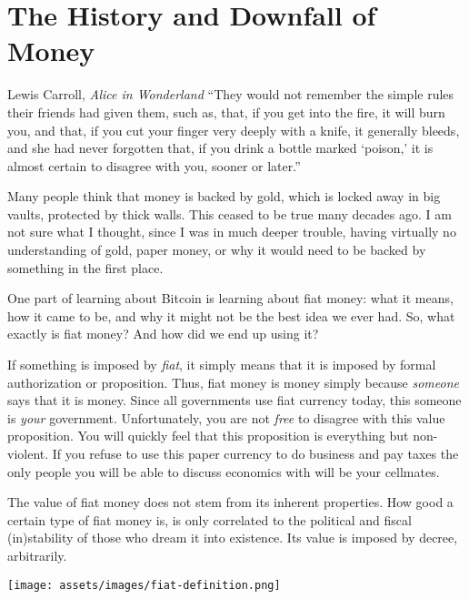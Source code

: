 \chapter{The History and Downfall of Money}
\label{les:12}

\begin{chapquote}{Lewis Carroll, \textit{Alice in Wonderland}}
\enquote{They would not remember the simple rules their friends had given them, such
as, that, if you get into the fire, it will burn you, and that, if you cut your
finger very deeply with a knife, it generally bleeds, and she had never
forgotten that, if you drink a bottle marked `poison,' it is almost certain to
disagree with you, sooner or later.}
\end{chapquote}

Many people think that money is backed by gold, which is locked away in
big vaults, protected by thick
walls. This ceased to be true many decades ago. I am not sure what I
thought, since I was in much deeper trouble, having virtually no
understanding of gold, paper money, or why it would need to be backed by
something in the first place.

One part of learning about Bitcoin is learning about fiat money: what it
means, how it came to be, and why it might not be the best idea we ever
had. So, what exactly is fiat money? And how did we end up using it?

If something is imposed by \textit{fiat}, it simply means that it is imposed by
formal authorization or proposition. Thus, fiat money is money simply
because \textit{someone} says that it is money. Since all governments use fiat
currency today, this someone is \textit{your} government. Unfortunately, you
are not \textit{free} to disagree with this value proposition. You will quickly
feel that this proposition is everything but non-violent. If you refuse
to use this paper currency to do business and pay taxes the only people
you will be able to discuss economics with will be your cellmates.

The value of fiat money does not stem from its inherent properties. How
good a certain type of fiat money is, is only correlated to the
political and fiscal (in)stability of those who dream it into existence.
Its value is imposed by decree, arbitrarily.

\begin{center}
  \centering
  \texttt{[image: assets/images/fiat-definition.png]}
  \label{fig:fiat-definition}
\end{center}

